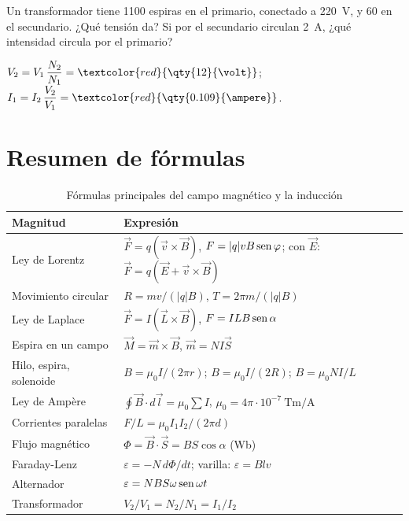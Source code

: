 \begin{exercise}
    Un transformador tiene 1100 espiras en el primario, conectado a \qty{220}{\volt}, y 60 en el secundario. ¿Qué tensión da? Si
    por el secundario circulan \qty{2}{\ampere}, ¿qué intensidad circula por el primario?
    \begin{solu}
        \(V_2 = V_1\,\dfrac{N_2}{N_1} = \textcolor{red}{\qty{12}{\volt}}\); \(I_1 = I_2\,\dfrac{V_2}{V_1} = \textcolor{red}{\qty{0.109}{\ampere}}\).
    \end{solu}
\end{exercise}

\section{Resumen de fórmulas}\label{sec:mag-resumen}

\begin{table}[H]
    \centering
    \caption{Fórmulas principales del campo magnético y la inducción}
    \vspace{-5pt}
    \begin{tabular}{@{}lL{10cm}@{}}
        \toprule
        \textbf{Magnitud} & \textbf{Expresión} \\
        \midrule
        Ley de Lorentz & \(\vec F = q(\vec v\times\vec B)\), \quad \(F = |q| v B\operatorname{sen}\varphi\); \quad con \(\vec E\): \(\vec F = q(\vec E + \vec v\times\vec B)\) \\[3pt]
        Movimiento circular & \(R = m v/(|q| B)\), \quad \(T = 2\pi m/(|q| B)\) \\[3pt]
        Ley de Laplace & \(\vec F = I(\vec L\times\vec B)\), \quad \(F = I L B\operatorname{sen}\alpha\) \\[3pt]
        Espira en un campo & \(\vec M = \vec m\times\vec B\), \quad \(\vec m = N I\vec S\) \\[3pt]
        Hilo, espira, solenoide & \(B = \mu_0 I/(2\pi r)\); \quad \(B = \mu_0 I/(2R)\); \quad \(B = \mu_0 N I/L\) \\[3pt]
        Ley de Ampère & \(\oint\vec B\cdot d\vec l = \mu_0\sum I\), \quad \(\mu_0 = 4\pi\cdot 10^{-7}\ \unit{\tesla\m\per\ampere}\) \\[3pt]
        Corrientes paralelas & \(F/L = \mu_0 I_1 I_2/(2\pi d)\) \\[3pt]
        Flujo magnético & \(\Phi = \vec B\cdot\vec S = B S\cos\alpha\) \quad (\unit{\weber}) \\[3pt]
        Faraday-Lenz & \(\varepsilon = -N\,d\Phi/dt\); \quad varilla: \(\varepsilon = B l v\) \\[3pt]
        Alternador & \(\varepsilon = N B S\omega\operatorname{sen}\omega t\) \\[3pt]
        Transformador & \(V_2/V_1 = N_2/N_1 = I_1/I_2\) \\
        \bottomrule
    \end{tabular}
    \label{tab:mag-resumen}
\end{table}


